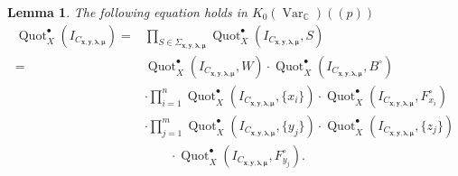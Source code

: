 \documentclass[12pt]{amsart}
\newtheorem{lemma}[theorem]{Lemma}
\theoremstyle{definition}
\newcommand{\CC} {\mathbb{C}}          %
\newcommand{\Quot}{\operatorname{Quot}}
\newcommand{\Var}{\operatorname{Var}}
\newcommand{\boldx}{\boldsymbol{x}}
\newcommand{\boldy}{\boldsymbol{y}}
\newcommand{\boldlambda}{\boldsymbol{\lambda }}
\newcommand{\boldmu}{\boldsymbol{\mu }}
\begin{document}
\begin{lemma}\label{lem: Sigma = product of local Hilbert schemes}
The following equation holds in $K_{0}(\Var_{\CC})(\!(p)\!)$
\begin{align*}
\Quot_X^{\bullet}(I_{C_{\boldx, \boldy, \boldlambda, \boldmu}}) = &\prod_{S \in \Sigma_{\boldx, \boldy, \boldlambda, \boldmu}} \Quot_X^{\bullet}(I_{C_{\boldx, \boldy, \boldlambda, \boldmu}},S) \\
=&\Quot_X^{\bullet}(I_{C_{\boldx, \boldy, \boldlambda, \boldmu}},W) \cdot
\Quot_X^{\bullet}(I_{C_{\boldx, \boldy, \boldlambda, \boldmu}},B^\circ) \\
&\cdot \prod_{i=1}^{n}
\Quot_X^{\bullet}(I_{C_{\boldx, \boldy, \boldlambda, \boldmu}},\{x_i\}) \cdot
\Quot_X^{\bullet}(I_{C_{\boldx, \boldy, \boldlambda, \boldmu}},F_{x_i}^\circ) \\
&\cdot \prod_{j=1}^{m}
\Quot_X^{\bullet}(I_{C_{\boldx, \boldy, \boldlambda, \boldmu}},\{y_j\}) \cdot
\Quot_X^{\bullet}(I_{C_{\boldx, \boldy, \boldlambda, \boldmu}},\{z_j\}) \\
&\qquad \cdot \Quot_X^{\bullet}(I_{C_{\boldx, \boldy, \boldlambda, \boldmu}},F^\circ_{y_j}).
\end{align*}
\end{lemma}
\end{document}
